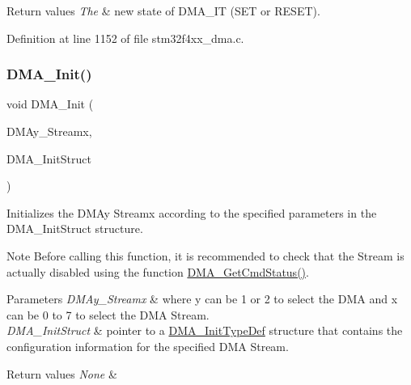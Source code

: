 \begin{DoxyRetVals}{Return values}
{\em The} & new state of D\+M\+A\+\_\+\+IT (S\+ET or R\+E\+S\+ET). \\
\hline
\end{DoxyRetVals}


Definition at line 1152 of file stm32f4xx\+\_\+dma.\+c.

\mbox{\label{group___d_m_a_gaced8a4149acfb0a50b50e63273a87148}} 
\subsubsection{\texorpdfstring{D\+M\+A\+\_\+\+Init()}{DMA\_Init()}}
{\footnotesize\ttfamily void D\+M\+A\+\_\+\+Init (\begin{DoxyParamCaption}\item[{\hyperlink{struct_d_m_a___stream___type_def}{D\+M\+A\+\_\+\+Stream\+\_\+\+Type\+Def} $\ast$}]{D\+M\+Ay\+\_\+\+Streamx,  }\item[{\hyperlink{struct_d_m_a___init_type_def}{D\+M\+A\+\_\+\+Init\+Type\+Def} $\ast$}]{D\+M\+A\+\_\+\+Init\+Struct }\end{DoxyParamCaption})}



Initializes the D\+M\+Ay Streamx according to the specified parameters in the D\+M\+A\+\_\+\+Init\+Struct structure. 

\begin{DoxyNote}{Note}
Before calling this function, it is recommended to check that the Stream is actually disabled using the function \hyperlink{group___d_m_a___group4_gaa4d631cdd6cd020106435f30c0c6fb15}{D\+M\+A\+\_\+\+Get\+Cmd\+Status()}. 
\end{DoxyNote}

\begin{DoxyParams}{Parameters}
{\em D\+M\+Ay\+\_\+\+Streamx} & where y can be 1 or 2 to select the D\+MA and x can be 0 to 7 to select the D\+MA Stream. \\
\hline
{\em D\+M\+A\+\_\+\+Init\+Struct} & pointer to a \hyperlink{struct_d_m_a___init_type_def}{D\+M\+A\+\_\+\+Init\+Type\+Def} structure that contains the configuration information for the specified D\+MA Stream. \\
\hline
\end{DoxyParams}

\begin{DoxyRetVals}{Return values}
{\em None} & \\
\hline
\end{DoxyRetVals}


